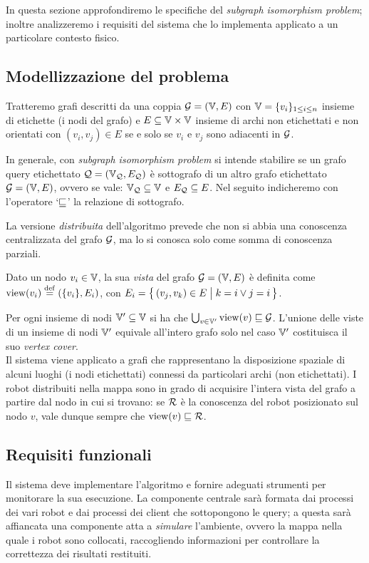 In questa sezione approfondiremo le specifiche del
\emph{subgraph isomorphism problem}; inoltre analizzeremo i
requisiti del sistema che lo implementa applicato a un particolare
contesto fisico.

\subsection{Modellizzazione del problema}
\label{sec:problem}
Tratteremo grafi descritti da una coppia
$\mathcal{G} = (\mathbb{V}, E)$ con $\mathbb{V} = \{ v_i \}_{1 \leq i \leq n}$ insieme di
etichette (i nodi del grafo) e $E \subseteq \mathbb{V} \times \mathbb{V}$
insieme di archi non etichettati e non orientati con
$(v_i, v_j) \in E$ se e solo se $v_i$ e $v_j$ sono adiacenti in $\mathcal{G}$.

In generale, con \emph{subgraph isomorphism problem} si intende
stabilire se un grafo query etichettato $\mathcal{Q} = (\mathbb{V}_{\mathcal{Q}}, E_{\mathcal{Q}})$ è
sottografo di un altro grafo etichettato $\mathcal{G} = ( \mathbb{V}, E)$,
ovvero se vale: $\mathbb{V}_{\mathcal{Q}} \subseteq \mathbb{V}$ e $E_{\mathcal{Q}} \subseteq E$.
Nel seguito indicheremo con l'operatore `$\sqsubseteq$' la relazione
di sottografo.

La versione \emph{distribuita} dell'algoritmo prevede che
non si abbia una conoscenza centralizzata del grafo $\mathcal{G}$,
ma lo si conosca solo come somma di conoscenza parziali.

\begin{definition}
Dato un nodo $v_i \in \mathbb{V}$, la sua \emph{vista} del grafo
$\mathcal{G} = (\mathbb{V}, E)$ è definita come $\view(v_i) \defeq (\{v_i\}, E_i)$, con
$E_i = \bigl\{\,(v_j, v_k) \in E \bigm| k = i \vee j = i \,\bigr\}$.
\end{definition}

Per ogni insieme di nodi $\mathbb{V}' \subseteq \mathbb{V}$ si ha che
$\bigcup_{v \in \mathbb{V}'} \mathrm{view}(v) \sqsubseteq \mathcal{G}$.
L'unione delle viste di un insieme di nodi $\mathbb{V}'$ equivale
all'intero grafo solo nel caso $\mathbb{V}'$ costituisca il suo
\emph{vertex cover}.\\

Il sistema viene applicato a grafi che rappresentano la
disposizione spaziale di alcuni luoghi (i nodi etichettati)
connessi da particolari archi (non etichettati).
I robot distribuiti nella mappa sono in grado di acquisire
l'intera vista del grafo a partire dal nodo in cui si trovano:
se $\mathcal{R}$ è la conoscenza del robot posizionato sul nodo $v$,
vale dunque sempre che $\mathrm{view}(v) \sqsubseteq \mathcal{R}$.

\subsection{Requisiti funzionali}
\label{sec:func-req}
Il sistema deve implementare l'algoritmo e fornire adeguati strumenti
per monitorare la sua esecuzione.
La componente centrale sarà formata dai processi dei vari robot e dai
processi dei client che sottopongono le query; a questa
sarà affiancata una componente atta a \emph{simulare}
l'ambiente, ovvero la mappa nella quale i robot sono collocati,
raccogliendo informazioni per controllare la correttezza dei risultati
restituiti.

